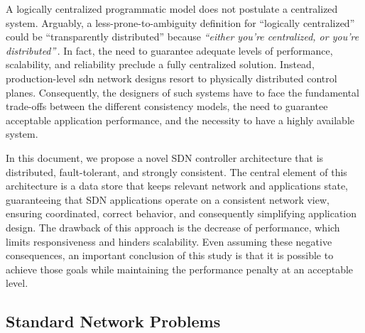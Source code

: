 A logically centralized programmatic model does not postulate a centralized system. Arguably, a less-prone-to-ambiguity definition for ``logically centralized'' could be ``transparently distributed'' because \emph{``either you're centralized, or you're distributed''}\,\cite{casado2011}.
In fact, the need to guarantee adequate levels of performance, scalability, and reliability preclude a fully centralized solution.
Instead, production-level \gls{sdn} network designs resort to physically distributed control planes.
Consequently, the designers of such systems have to face the fundamental trade-offs between the different consistency models, the need to guarantee acceptable application performance, and the necessity to have a highly available system.


In this document, we propose a novel SDN controller architecture that is distributed, fault-tolerant, and strongly consistent.
The central element of this architecture is a data store that keeps relevant network and applications state, guaranteeing that SDN applications operate on a consistent network view, ensuring coordinated, correct behavior, and consequently simplifying application design. The drawback of  this approach  is the decrease of performance, which limits responsiveness and hinders scalability. Even assuming these negative consequences, an important conclusion of this study is that it is possible to achieve those goals while maintaining the performance penalty at an acceptable level.

\subsection{Standard Network Problems}


